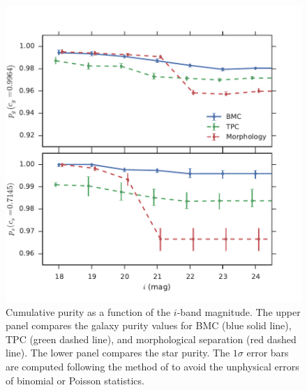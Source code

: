 \begin{figure}[htp]
  \centering
  \includegraphics[width=0.8\linewidth]{figures/purity_mag_integrated.pdf}
  \caption{Cumulative purity as a function of the $i$-band magnitude.
           The upper panel compares
           the galaxy purity values for BMC (blue solid line),
           TPC (green dashed line), and 
           morphological separation (red dashed line).
           The lower panel compares the star purity.
           The $1 \sigma$ error bars are computed following the method
           of \citet{paterno2004calculating} to avoid the unphysical
           errors of binomial or Poisson statistics.}
  \label{fig:purity_mag_integrated}
\end{figure}


